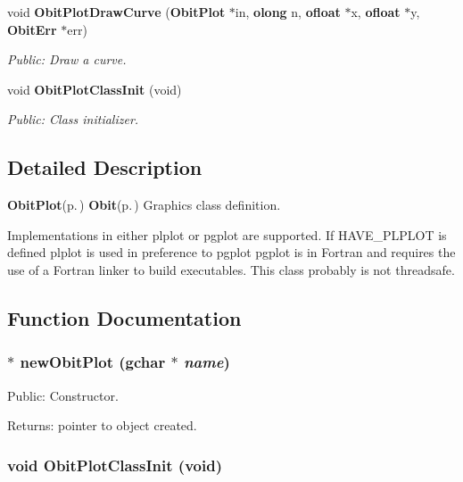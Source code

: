 \begin{CompactItemize}
void {\bf Obit\-Plot\-Draw\-Curve} ({\bf Obit\-Plot} $\ast$in, {\bf olong} n, {\bf ofloat} $\ast$x, {\bf ofloat} $\ast$y, {\bf Obit\-Err} $\ast$err)
\begin{CompactList}\small\item\em Public: Draw a curve. \item\end{CompactList}\item 
void {\bf Obit\-Plot\-Class\-Init} (void)
\begin{CompactList}\small\item\em Public: Class initializer. \item\end{CompactList}\end{CompactItemize}


\subsection{Detailed Description}
{\bf Obit\-Plot}{\rm (p.\,\pageref{structObitPlot})} {\bf Obit}{\rm (p.\,\pageref{structObit})} Graphics class definition. 

Implementations in either plplot or pgplot are supported. If HAVE\_\-PLPLOT is defined plplot is used in preference to pgplot pgplot is in Fortran and requires the use of a Fortran linker to build executables. This class probably is not threadsafe.

\subsection{Function Documentation}
\subsubsection{$\ast$ new\-Obit\-Plot (gchar $\ast$ {\em name})}\label{ObitPlot_8c_a6}


Public: Constructor. 

\begin{Desc}
\item[Returns:]pointer to object created. \end{Desc}
\subsubsection{\setlength{\rightskip}{0pt plus 5cm}void Obit\-Plot\-Class\-Init (void)}\label{ObitPlot_8c_a30}


